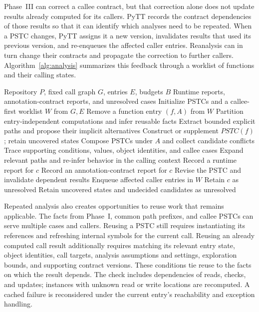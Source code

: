 Phase~III can correct a callee contract, but that correction alone does
not update results already computed for its callers. PyTT records the
contract dependencies of those results so that it can identify which
analyses need to be repeated. When a PSTC changes, PyTT assigns it a new
version, invalidates results that used its previous version, and
re-enqueues the affected caller entries. Reanalysis can in turn change
their contracts and propagate the correction to further callers.
Algorithm~\ref{alg:analysis} summarizes this feedback through a worklist
of functions and their calling states.

\begin{algorithm}[t]
\caption{PSTC propagation and conflict-driven refinement}
\label{alg:analysis}
\begin{algorithmic}[1]
\Require Repository $P$, fixed call graph $G$, entries $E$, budgets $B$
\Ensure Runtime reports, annotation-contract reports, and unresolved cases
\State Initialize PSTCs and a callee-first worklist $W$ from $G,E$
  \State Remove a function entry $(f,A)$ from $W$
  \State Partition entry-independent computations and infer reusable facts
  \State Extract bounded explicit paths and propose their implicit alternatives
  \State Construct or supplement $\mathit{PSTC}(f)$; retain uncovered states
  \State Compose PSTCs under $A$ and collect candidate conflicts
    \State Trace supporting conditions, values, object identities, and callee cases
    \State Expand relevant paths and re-infer behavior in the calling context
      \State Record a runtime report for $c$
      \State Record an annotation-contract report for $c$
      \State Revise the PSTC and invalidate dependent results
      \State Enqueue affected caller entries in $W$
    \Else
      \State Retain $c$ as unresolved
    \EndIf
  \EndFor
\EndWhile
\State Retain uncovered states and undecided candidates as unresolved
\end{algorithmic}
\end{algorithm}

Repeated analysis also creates opportunities to reuse work that remains
applicable. The facts from Phase~I, common path prefixes, and callee
PSTCs can serve multiple cases and callers. Reusing a PSTC still requires
instantiating its references and refreshing internal symbols for the
current call. Reusing an already computed call result additionally
requires matching its relevant entry state, object identities, call
targets, analysis assumptions and settings, exploration bounds, and
supporting contract versions. These conditions tie reuse to the facts
on which the result depends. The check includes dependencies of reads,
checks, and updates; instances with unknown read or write locations are
recomputed. A cached failure is reconsidered under the current entry's
reachability and exception handling.

